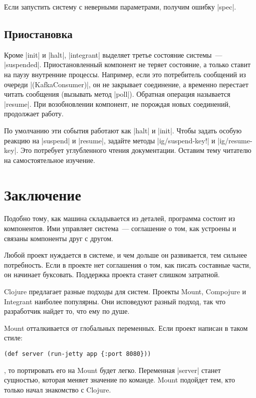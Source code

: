 Если запустить систему с неверными параметрами, получим ошибку \spverb|spec|.

\subsection{Приостановка}

Кроме \spverb|init| и \spverb|halt|, \spverb|integrant| выделяет третье
состояние системы~--- \spverb|suspended|. Приостановленный компонент не теряет
состояние, а только ставит на паузу внутренние процессы. Например, если это
потребитель сообщений из очереди \spverb|(KafkaConsumer)|, он не закрывает
соединение, а временно перестает читать сообщения (вызывать метод
\spverb|poll|). Обратная операция называется \spverb|resume|. При возобновлении
компонент, не порождая новых соединений, продолжает работу.

По умолчанию эти события работают как \spverb|halt| и \spverb|init|. Чтобы
задать особую реакцию на \spverb|suspend| и \spverb|resume|, задайте методы
\spverb|ig/suspend-key!| и \spverb|ig/resume-key|. Это потребует углубленного
чтения документации. Оставим тему читателю на самостоятельное изучение.

\section{Заключение}

Подобно тому, как машина складывается из деталей, программа состоит из
компонентов. Ими управляет система~--- соглашение о том, как устроены и связаны
компоненты друг с другом.

Любой проект нуждается в системе, и чем дольше он развивается, тем сильнее
потребность. Если в проекте нет соглашения о том, как писать составные части, он
начинает буксовать. Поддержка проекта станет слишком затратной.


Clojure предлагает разные подходы для систем. Проекты Mount, Compojure и
Integrant наиболее популярны. Они исповедуют разный подход, так что разработчик
найдет то, что ему по душе.

Mount отталкивается от глобальных переменных. Если проект написан в таком стиле:

\begin{verbatim}
(def server (run-jetty app {:port 8080}))
\end{verbatim}

\noindent
, то портировать его на Mount будет легко. Переменная \spverb|server| станет
сущностью, которая меняет значение по команде. Mount подойдет тем, кто только
начал знакомство с Clojure.

